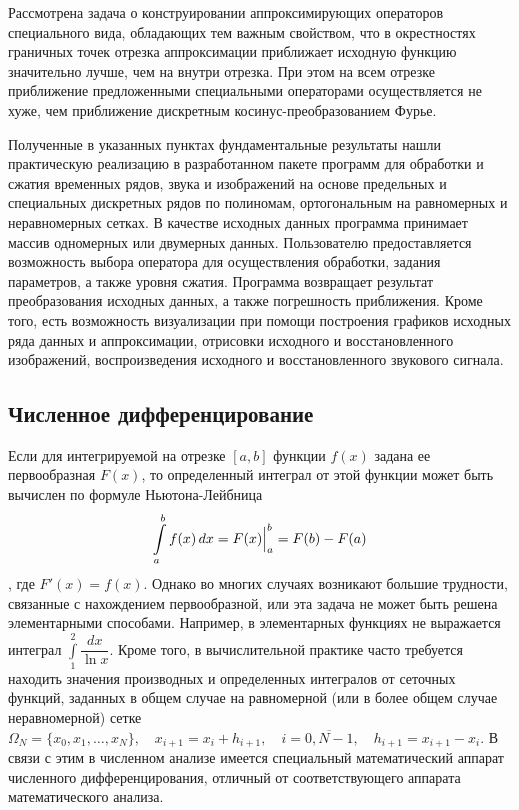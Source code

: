 Рассмотрена задача о конструировании аппроксимирующих операторов специального вида, обладающих тем важным свойством, что в окрестностях граничных точек отрезка аппроксимации приближает исходную функцию значительно лучше, чем на внутри отрезка. При этом на всем отрезке приближение предложенными специальными операторами осуществляется не хуже, чем приближение дискретным косинус-преобразованием Фурье.

Полученные в указанных пунктах фундаментальные результаты нашли практическую реализацию в разработанном пакете программ для обработки и сжатия временных рядов, звука и изображений на основе предельных и специальных дискретных рядов по полиномам, ортогональным на равномерных и неравномерных сетках.
В качестве исходных данных программа принимает массив одномерных или двумерных данных. Пользователю предоставляется возможность выбора оператора для осуществления обработки, задания параметров, а также уровня сжатия. Программа возвращает результат преобразования исходных данных, а также погрешность приближения. Кроме того, есть возможность визуализации при помощи построения графиков исходных ряда данных и аппроксимации, отрисовки исходного и восстановленного изображений, воспроизведения исходного и восстановленного звукового сигнала.



\subsection{Численное дифференцирование}\label{sect-numdiff}

Если для интегрируемой на отрезке $[a,b]$ функции $f(x)$ задана ее первообразная $F(x)$, то определенный интеграл от этой функции может быть вычислен по формуле Ньютона-Лейбница
$$
\int\limits_{a}^{b} f(x)\,dx= \Bigl.{F(x)}\Bigr|_{a}^{b}= F(b)-F(a)
$$,
где $F'(x)=f(x)$. Однако во многих случаях возникают большие трудности, связанные с нахождением первообразной, или эта задача не может быть решена элементарными способами. Например, в элементарных функциях не выражается интеграл $\textstyle{\int\limits_{1}^{2} \dfrac{dx}{\ln x}}$.
Кроме того, в вычислительной практике часто требуется находить значения производных и определенных интегралов от сеточных функций, заданных в общем случае на равномерной (или в более общем случае неравномерной) сетке
$\Omega_N= \bigl\{x_0,x_1,\ldots,x_N\bigr\},\quad x_{i+1}= x_i+h_{i+1},\quad i=\overline{0,N-1},\quad h_{i+1}= x_{i+1}-x_i$.
В связи с этим в численном анализе имеется специальный математический аппарат численного дифференцирования, отличный от соответствующего аппарата математического анализа.

